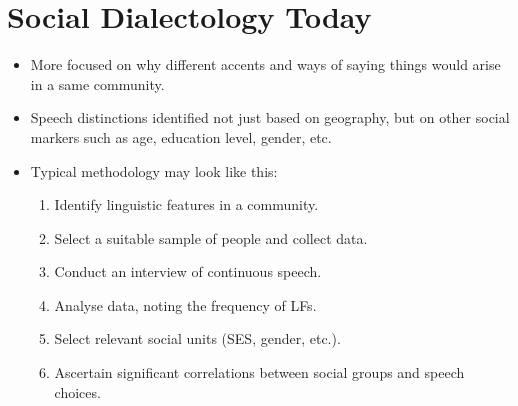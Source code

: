 \documentclass[../main.tex]{subfiles}
\begin{document}
        \section{Social Dialectology Today}
        \begin{itemize}
            \item More focused on why different accents and ways of saying things would arise in a same community.
            \item Speech distinctions identified not just based on geography, but on other social markers such as age, education level, gender, etc.
            \item Typical methodology may look like this: \begin{enumerate}
                \item Identify linguistic features in a community.
                \item Select a suitable sample of people and collect data.
                \item Conduct an interview of continuous speech.
                \item Analyse data, noting the frequency of LFs.
                \item Select relevant social units (SES, gender, etc.).
                \item Ascertain significant correlations between social groups and speech choices.
            \end{enumerate}
        \end{itemize}

        
\end{document}
